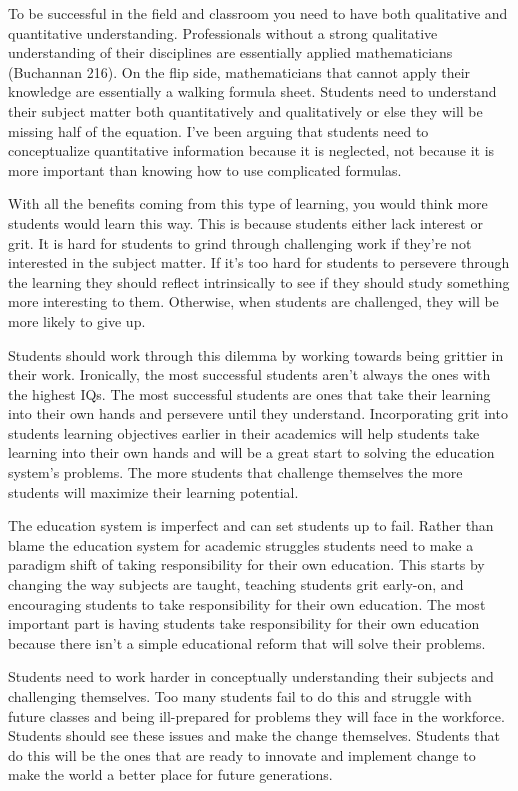 \documentclass[11pt,]{article}
\begin{document}
To be successful in the field and classroom you need to have both
qualitative and quantitative understanding. Professionals without a
strong qualitative understanding of their disciplines are essentially
applied mathematicians (Buchannan 216). On the flip side, mathematicians
that cannot apply their knowledge are essentially a walking formula
sheet. Students need to understand their subject matter both
quantitatively and qualitatively or else they will be missing half of
the equation. I've been arguing that students need to conceptualize
quantitative information because it is neglected, not because it is more
important than knowing how to use complicated formulas.

With all the benefits coming from this type of learning, you would think
more students would learn this way. This is because students either lack
interest or grit. It is hard for students to grind through challenging
work if they're not interested in the subject matter. If it's too hard
for students to persevere through the learning they should reflect
intrinsically to see if they should study something more interesting to
them. Otherwise, when students are challenged, they will be more likely
to give up.

Students should work through this dilemma by working towards being
grittier in their work. Ironically, the most successful students aren't
always the ones with the highest IQs. The most successful students are
ones that take their learning into their own hands and persevere until
they understand. Incorporating grit into students learning objectives
earlier in their academics will help students take learning into their
own hands and will be a great start to solving the education system's
problems. The more students that challenge themselves the more students
will maximize their learning potential.

The education system is imperfect and can set students up to fail.
Rather than blame the education system for academic struggles students
need to make a paradigm shift of taking responsibility for their own
education. This starts by changing the way subjects are taught, teaching
students grit early-on, and encouraging students to take responsibility
for their own education. The most important part is having students take
responsibility for their own education because there isn't a simple
educational reform that will solve their problems.

Students need to work harder in conceptually understanding their
subjects and challenging themselves. Too many students fail to do this
and struggle with future classes and being ill-prepared for problems
they will face in the workforce. Students should see these issues and
make the change themselves. Students that do this will be the ones that
are ready to innovate and implement change to make the world a better
place for future generations.

\newpage
\singlespacing 

\end{document}
